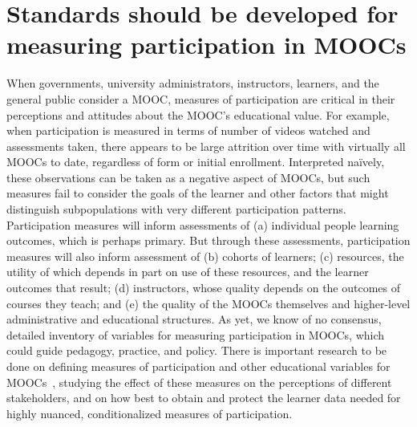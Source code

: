 \section{Standards should be developed for measuring participation in MOOCs}



When governments, university administrators, instructors, learners, and
the general public consider a MOOC, measures of participation are
critical in their perceptions and attitudes about the MOOC's educational
value. For example, when participation is measured in terms of number of
videos watched and assessments taken, there appears to be large
attrition over time with virtually all MOOCs to date, regardless of form
or initial enrollment. Interpreted na\"{i}vely, these observations can be
taken as a negative aspect of MOOCs, but such measures fail to consider
the goals of the learner and other factors that might distinguish
subpopulations with very different participation patterns.
Participation measures will inform assessments of (a) individual people
learning outcomes, which is perhaps primary. But through these
assessments, participation measures will also inform assessment of (b)
cohorts of learners; (c) resources, the utility of which depends in part
on use of these resources, and the learner outcomes that result; (d)
instructors, whose quality depends on the outcomes of courses they
teach; and (e) the quality of the MOOCs themselves and higher-level
administrative and educational structures.  As yet, we know of no
consensus, detailed inventory of variables for measuring participation
in MOOCs, which could guide pedagogy, practice, and policy.
There is
important research to be done on defining measures of participation and
other educational variables for MOOCs~\cite{deboer-ho-reconceptualizing},
studying the effect of these measures on the perceptions of different
stakeholders, and on how best to obtain and protect the
learner data needed for highly nuanced, conditionalized
measures of participation.  

